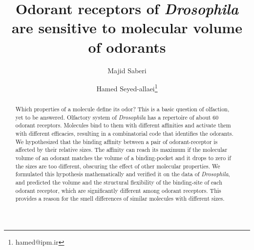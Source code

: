 \documentclass[11pt]{paper} %
\title{Odorant receptors of \textit{Drosophila} are sensitive to molecular volume of odorants}
\author{Majid Saberi \and Hamed Seyed-allaei\thanks{hamed@ipm.ir}}
\begin{document}

\maketitle

\begin{abstract} 
Which properties of a molecule define its odor? This is a basic question of olfaction, 
yet to be answered. Olfactory system of \textit{Drosophila} has a repertoire of about 60 odorant receptors. 
Molecules bind to them with different affinities and activate them with different efficacies, 
resulting in a combinatorial code that identifies the odorants. 
We hypothesized that the binding affinity between a pair of odorant-receptor is affected by their relative sizes. 
The affinity can reach its maximum if the molecular volume of an odorant matches the volume of a binding-pocket 
and it drops to zero if the sizes are too different, 
obscuring the effect of other molecular properties. 
We formulated this hypothesis mathematically and verified it on the data of \textit{Drosophila}, 
and predicted the volume and the structural flexibility of the binding-site of each odorant receptor, 
which are significantly different among odorant receptors. 
This provides a reason for the smell differences of similar molecules with different sizes. 
\end{abstract}


\end{document}
